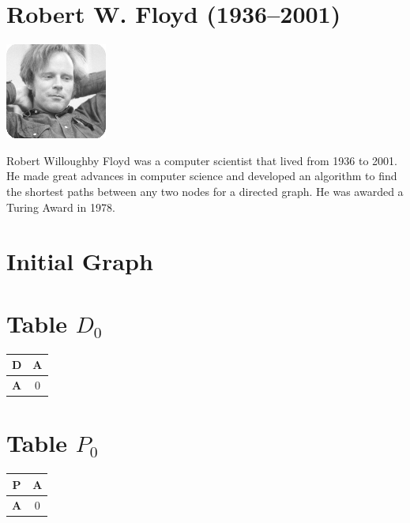 \documentclass{article}
\begin{document}
\section{Robert W. Floyd (1936–2001)}
\begin{center}
\includegraphics[width=0.25\textwidth]{floyd.jpg}
\end{center}
Robert Willoughby Floyd was a computer scientist that lived from 1936 to 2001. He made great advances in computer science and developed an algorithm to find the shortest paths between any two nodes for a directed graph. He was awarded a Turing Award in 1978.


\section{Initial Graph}
\begin{center}
\end{center}
\section{Table $D_{0}$}
\begin{center}
    \begin{tabular}{|c||c|}
        \hline
        \textbf{D} & \textbf{A} \\
        \hline
        \hline
        \textbf{A}& 0 \\
        \hline
    \end{tabular}
\end{center}


\section{Table $P_{0}$}
\begin{center}
    \begin{tabular}{|c||c|}
        \hline
        \textbf{P} & \textbf{A} \\
        \hline
        \hline
        \textbf{A}& 0 \\
        \hline
    \end{tabular}
\end{center}
\end{document}
